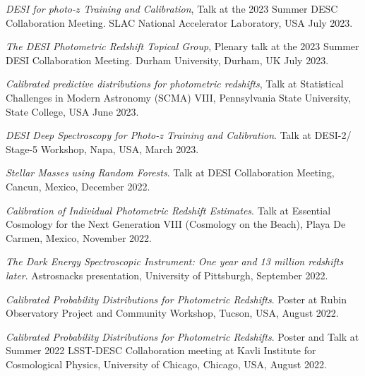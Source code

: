 
 \begin{etaremune}[leftmargin=40pt,labelsep=10pt]
 
    \item \textit{DESI for photo-$z$ Training and Calibration}, Talk at the 2023 Summer DESC Collaboration Meeting. SLAC National Accelerator Laboratory, USA July 2023.
     \item \textit{The DESI Photometric Redshift Topical Group}, Plenary talk at the 2023 Summer DESI Collaboration Meeting. Durham University, Durham, UK July 2023.
    \item \textit{Calibrated predictive distributions for photometric redshifts}, Talk at Statistical Challenges in Modern Astronomy (SCMA) VIII, Pennsylvania State University, State College, USA June 2023.
    \item \textit{DESI Deep Spectroscopy for Photo-z Training and Calibration}. Talk at DESI-2/ Stage-5 Workshop, Napa, USA, March 2023.
    \item \textit{Stellar Masses using Random Forests}. Talk at DESI Collaboration Meeting, Cancun, Mexico, December 2022.
    \item \textit{Calibration of Individual Photometric Redshift Estimates}. Talk at Essential Cosmology for the Next Generation VIII (Cosmology on the Beach), Playa De Carmen, Mexico, November 2022.
    \item \textit{The Dark Energy Spectroscopic Instrument: One year and 13 million redshifts later}. Astrosnacks presentation, University of Pittsburgh, September 2022.
    \item \textit{Calibrated Probability Distributions for Photometric Redshifts}. Poster at Rubin Observatory Project and Community Workshop, Tucson, USA, August 2022.
    \item \textit{Calibrated Probability Distributions for Photometric Redshifts}. Poster and Talk at Summer 2022 LSST-DESC Collaboration meeting at Kavli Institute for Cosmological Physics, University of Chicago, Chicago, USA, August 2022.

\end{etaremune}
